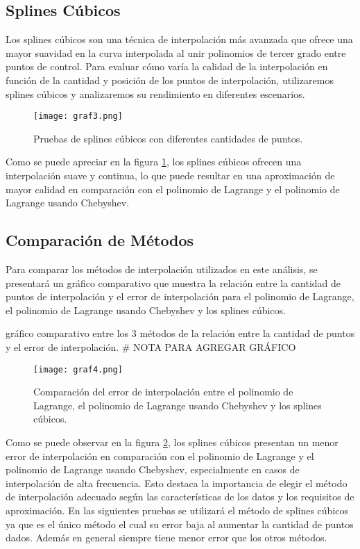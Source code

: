\documentclass[12pt,a4]{article} %
\begin{document}
\begin{multicols}{2}
\subsection{Splines Cúbicos}

Los splines cúbicos son una técnica de interpolación más avanzada que ofrece una mayor suavidad en la curva interpolada al unir polinomios de tercer grado entre puntos de control. Para evaluar cómo varía la calidad de la interpolación en función de la cantidad y posición de los puntos de interpolación, utilizaremos splines cúbicos y analizaremos su rendimiento en diferentes escenarios.

\begin{figure} [H]
    \centering
    \texttt{[image: graf3.png]}
    \caption{Pruebas de splines cúbicos con diferentes cantidades de puntos.}
    \label{graf3}
\end{figure}

Como se puede apreciar en la figura \ref{graf3}, los splines cúbicos ofrecen una interpolación suave y continua, lo que puede resultar en una aproximación de mayor calidad en comparación con el polinomio de Lagrange y el polinomio de Lagrange usando Chebyshev.

\subsection{Comparación de Métodos}

Para comparar los métodos de interpolación utilizados en este análisis, se presentará un gráfico comparativo que muestra la relación entre la cantidad de puntos de interpolación y el error de interpolación para el polinomio de Lagrange, el polinomio de Lagrange usando Chebyshev y los splines cúbicos.

gráfico comparativo entre los 3 métodos de la relación entre la cantidad de puntos y el error de interpolación. # NOTA PARA AGREGAR GRÁFICO

\begin{figure} [H]
    \centering
    \texttt{[image: graf4.png]}
    \caption{Comparación del error de interpolación entre el polinomio de Lagrange, el polinomio de Lagrange usando Chebyshev y los splines cúbicos.}
    \label{graf4}
\end{figure}

Como se puede observar en la figura \ref{graf4}, los splines cúbicos presentan un menor error de interpolación en comparación con el polinomio de Lagrange y el polinomio de Lagrange usando Chebyshev, especialmente en casos de interpolación de alta frecuencia. Esto destaca la importancia de elegir el método de interpolación adecuado según las características de los datos y los requisitos de aproximación. En las siguientes pruebas se utilizará el método de splines cúbicos ya que es el único método el cual su error baja al aumentar la cantidad de puntos dados. Además en general siempre tiene menor error que los otros métodos.


\end{multicols}
\end{document}

